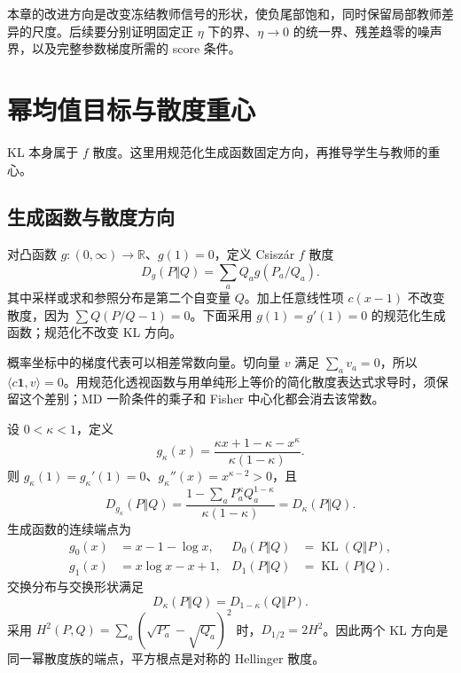 \documentclass[lang=cn,scheme=chinese,openany]{../book/elegantbook}
\newcommand{\KL}{\operatorname{KL}}
\begin{document}
本章的改进方向是改变冻结教师信号的形状，使负尾部饱和，同时保留局部教师差异的尺度。后续要分别证明固定正 $\eta$ 下的界、$\eta\to0$ 的统一界、残差趋零的噪声界，以及完整参数梯度所需的 score 条件。



\section{幂均值目标与散度重心}
\label{sec:proximal-barycenters}

\label{sec:proximal-divergence-map}

KL 本身属于 $f$ 散度。这里用规范化生成函数固定方向，再推导学生与教师的重心。

\subsection{生成函数与散度方向}

对凸函数 $g:(0,\infty)\to\mathbb R$、$g(1)=0$，定义 Csisz\'ar $f$ 散度
\begin{equation}
 D_g(P\Vert Q)=\sum_a Q_a g(P_a/Q_a).
 \label{eq:divergence-map-csiszar}
\end{equation}
其中采样或求和参照分布是第二个自变量 $Q$。加上任意线性项 $c(x-1)$ 不改变散度，因为 $\sum Q(P/Q-1)=0$。下面采用 $g(1)=g'(1)=0$ 的规范化生成函数；规范化不改变 KL 方向。

概率坐标中的梯度代表可以相差常数向量。切向量 $v$ 满足 $\sum_av_a=0$，所以 $\langle c\boldsymbol1,v\rangle=0$。用规范化透视函数与用单纯形上等价的简化散度表达式求导时，须保留这个差别；MD 一阶条件的乘子和 Fisher 中心化都会消去该常数。

\begin{theorem}
\label{thm:divergence-map-power}
设 $0<\kappa<1$，定义
\begin{equation}
 g_\kappa(x)=\frac{\kappa x+1-\kappa-x^\kappa}{\kappa(1-\kappa)}.
 \label{eq:divergence-map-power-generator}
\end{equation}
则 $g_\kappa(1)=g_\kappa'(1)=0$、$g_\kappa''(x)=x^{\kappa-2}>0$，且
\begin{equation}
 D_{g_\kappa}(P\Vert Q)
 =\frac{1-\sum_a P_a^\kappa Q_a^{1-\kappa}}{\kappa(1-\kappa)}
 =D_\kappa(P\Vert Q).
 \label{eq:proximal-power-divergence}
\end{equation}
生成函数的连续端点为
\begin{align}
 g_0(x)&=x-1-\log x,&D_0(P\Vert Q)&=\KL(Q\Vert P),\\
 g_1(x)&=x\log x-x+1,&D_1(P\Vert Q)&=\KL(P\Vert Q).
 \label{eq:divergence-map-kl-endpoints}
\end{align}
交换分布与交换形状满足
\begin{equation}
 D_\kappa(P\Vert Q)=D_{1-\kappa}(Q\Vert P).
 \label{eq:divergence-map-duality}
\end{equation}
采用 $H^2(P,Q)=\sum_a(\sqrt{P_a}-\sqrt{Q_a})^2$ 时，$D_{1/2}=2H^2$。因此两个 KL 方向是同一幂散度族的端点，平方根点是对称的 Hellinger 散度。
\end{theorem}
\end{document}
